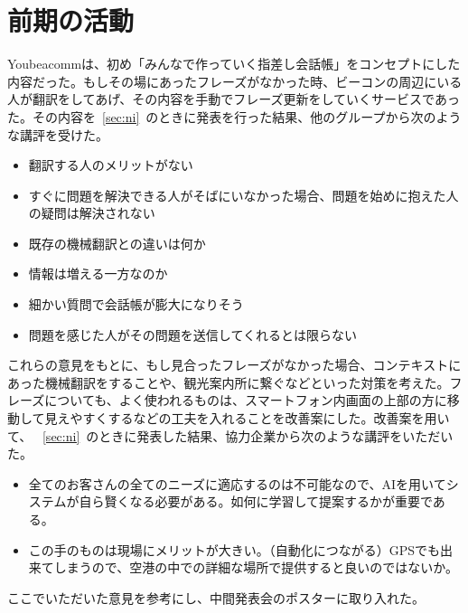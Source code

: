 \documentclass[openany,11pt,papersize]{jsbook}
\begin{document}
\section{前期の活動}
  Youbeacommは、初め「みんなで作っていく指差し会話帳」をコンセプトにした内容だった。もしその場にあったフレーズがなかった時、ビーコンの周辺にいる人が翻訳をしてあげ、その内容を手動でフレーズ更新をしていくサービスであった。その内容を~\ref{sec:ni}~のときに発表を行った結果、他のグループから次のような講評を受けた。
\begin{itemize}
\item 翻訳する人のメリットがない
\item すぐに問題を解決できる人がそばにいなかった場合、問題を始めに抱えた人の疑問は解決されない
\item 既存の機械翻訳との違いは何か
\item 情報は増える一方なのか
\item 細かい質問で会話帳が膨大になりそう
\item 問題を感じた人がその問題を送信してくれるとは限らない
\end{itemize}
これらの意見をもとに、もし見合ったフレーズがなかった場合、コンテキストにあった機械翻訳をすることや、観光案内所に繋ぐなどといった対策を考えた。フレーズについても、よく使われるものは、スマートフォン内画面の上部の方に移動して見えやすくするなどの工夫を入れることを改善案にした。改善案を用いて、 ~\ref{sec:ni}~のときに発表した結果、協力企業から次のような講評をいただいた。
\begin{itemize}
\item 全てのお客さんの全てのニーズに適応するのは不可能なので、AIを用いてシステムが自ら賢くなる必要がある。如何に学習して提案するかが重要である。
\item この手のものは現場にメリットが大きい。（自動化につながる）GPSでも出来てしまうので、空港の中での詳細な場所で提供すると良いのではないか。
\end{itemize}
ここでいただいた意見を参考にし、中間発表会のポスターに取り入れた。
\end{document}
